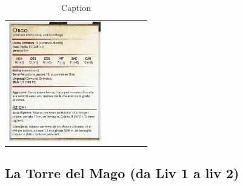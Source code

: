 \documentclass{article}
\begin{document}
\begin{table}
\begin{tabular}{|cr cr cr|}
        \includegraphics[width=4cm, height = 6 cm]{../Mostri/Orco.PNG} \\
    \end{tabular}
    \caption{Caption}
    \label{tab:my_label}
\end{table}







\newpage
\subsection{La Torre del Mago (da Liv 1 a liv 2)}
\end{document}
